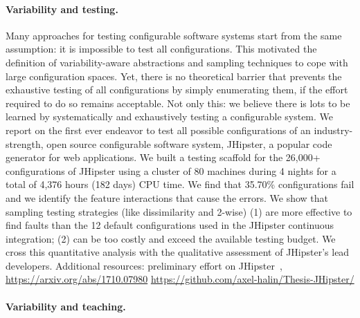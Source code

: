     
    
    



\paragraph{Variability and testing.}
Many approaches for testing configurable software systems start from the same assumption: it is impossible to test all configurations. This motivated the definition of variability-aware abstractions and sampling techniques to cope with large configuration spaces. Yet, there is no theoretical barrier that prevents the exhaustive testing of all configurations by simply enumerating them, if the effort required to do so remains acceptable. Not only this: we believe there is lots to be learned by systematically and exhaustively testing a configurable system. We report on the first ever endeavor to test all possible configurations of an industry-strength, open source configurable software system, JHipster, a popular code generator for web applications. We built a testing scaffold for the 26,000+ configurations of JHipster using a cluster of 80 machines during 4 nights for a total of 4,376 hours (182 days) CPU time. We find that 35.70\% configurations fail and we identify the feature interactions that cause the errors. We show that sampling testing strategies (like dissimilarity and 2-wise) (1) are more effective to find faults than the 12 default configurations used in the JHipster continuous integration; (2) can be too costly and exceed the available testing budget. We cross this quantitative analysis with the qualitative assessment of JHipster's lead developers.
Additional resources: preliminary effort on JHipster~\cite{halin:hal-01468084}, \url{https://arxiv.org/abs/1710.07980} \url{https://github.com/axel-halin/Thesis-JHipster/}


\paragraph{Variability and teaching.}

